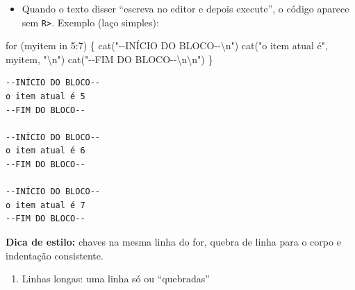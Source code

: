 \documentclass[
  letterpaper,
  DIV=11,
  numbers=noendperiod]{scrreprt}
\newenvironment{Shaded}{\begin{snugshade}}{\end{snugshade}}
\newcommand{\ControlFlowTok}[1]{\textcolor[rgb]{0.00,0.23,0.31}{#1}}
\newcommand{\DecValTok}[1]{\textcolor[rgb]{0.68,0.00,0.00}{#1}}
\newcommand{\FunctionTok}[1]{\textcolor[rgb]{0.28,0.35,0.67}{#1}}
\newcommand{\NormalTok}[1]{\textcolor[rgb]{0.00,0.23,0.31}{#1}}
\newcommand{\SpecialCharTok}[1]{\textcolor[rgb]{0.37,0.37,0.37}{#1}}
\newcommand{\StringTok}[1]{\textcolor[rgb]{0.13,0.47,0.30}{#1}}
\providecommand{\tightlist}{%
  \setlength{\itemsep}{0pt}\setlength{\parskip}{0pt}}\usepackage{longtable,booktabs,array}
\begin{document}
\begin{itemize}
\tightlist
\item
  Quando o texto disser ``escreva no editor e depois execute'', o código
  aparece sem \texttt{R\textgreater{}}. Exemplo (laço simples):
\end{itemize}

\begin{Shaded}
\begin{Highlighting}[]
\ControlFlowTok{for}\NormalTok{ (myitem }\ControlFlowTok{in} \DecValTok{5}\SpecialCharTok{:}\DecValTok{7}\NormalTok{) \{}
  \FunctionTok{cat}\NormalTok{(}\StringTok{"{-}{-}INÍCIO DO BLOCO{-}{-}}\SpecialCharTok{\textbackslash{}n}\StringTok{"}\NormalTok{)}
  \FunctionTok{cat}\NormalTok{(}\StringTok{"o item atual é"}\NormalTok{, myitem, }\StringTok{"}\SpecialCharTok{\textbackslash{}n}\StringTok{"}\NormalTok{)}
  \FunctionTok{cat}\NormalTok{(}\StringTok{"{-}{-}FIM DO BLOCO{-}{-}}\SpecialCharTok{\textbackslash{}n\textbackslash{}n}\StringTok{"}\NormalTok{)}
\NormalTok{\}}
\end{Highlighting}
\end{Shaded}

\begin{verbatim}
--INÍCIO DO BLOCO--
o item atual é 5 
--FIM DO BLOCO--

--INÍCIO DO BLOCO--
o item atual é 6 
--FIM DO BLOCO--

--INÍCIO DO BLOCO--
o item atual é 7 
--FIM DO BLOCO--
\end{verbatim}

\begin{tcolorbox}[enhanced jigsaw, left=2mm, toprule=.15mm, opacityback=0, title=\textcolor{quarto-callout-tip-color}{\faLightbulb}\hspace{0.5em}{Dica}, leftrule=.75mm, breakable, colbacktitle=quarto-callout-tip-color!10!white, coltitle=black, rightrule=.15mm, bottomtitle=1mm, toptitle=1mm, colframe=quarto-callout-tip-color-frame, colback=white, opacitybacktitle=0.6, bottomrule=.15mm, arc=.35mm, titlerule=0mm]

\textbf{Dica de estilo:} chaves na mesma linha do for, quebra de linha
para o corpo e indentação consistente.

\end{tcolorbox}

\begin{enumerate}
\def\labelenumi{\arabic{enumi})}
\setcounter{enumi}{2}
\tightlist
\item
  Linhas longas: uma linha só ou ``quebradas''
\end{enumerate}
\end{document}
